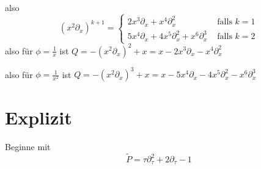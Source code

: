 \begin{comment}
$ [\partial_x^2,x^2]=\sum_i\frac{2\dots(2-i+1)}{i!}x^{2-i}\partial_x^{2-i}
=2x\partial_x+1 $
\end{comment}
also
\[
(x^2\partial_x)^{k+1}=
\begin{cases}
2x^3\partial_x+x^{4}\partial_x^2 & \mbox{ falls } k=1\\
5x^4\partial_x+4x^{5}\partial_x^2 +x^6\partial_x^3 & \mbox{ falls } k=2
\end{cases}
\]
also für $\phi=\frac{1}{x}$ ist 
$Q=-(x^2\partial_x)^{2}+x=x-2x^3\partial_x-x^{4}\partial_x^2$
\begin{center}
\end{center}

also für $\phi=\frac{1}{x^2}$ ist 
$Q=-(x^2\partial_x)^{3}+x=x-5x^4\partial_x-4x^{5}\partial_x^2-x^6\partial_x^3$

\section{Explizit}
Beginne mit
\[ \tilde P=\tau\partial_\tau^2+2\partial_\tau-1 \]

\begin{center}
\end{center}

